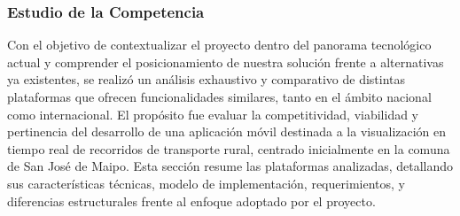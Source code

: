 \documentclass[12pt]{article}
\begin{document}
\subsubsection{Estudio de la Competencia}
Con el objetivo de contextualizar el proyecto dentro del panorama tecnológico actual y comprender el posicionamiento de nuestra solución frente a alternativas ya existentes, se realizó un análisis exhaustivo y comparativo de distintas plataformas que ofrecen funcionalidades similares, tanto en el ámbito nacional como internacional. El propósito fue evaluar la competitividad, viabilidad y pertinencia del desarrollo de una aplicación móvil destinada a la visualización en tiempo real de recorridos de transporte rural, centrado inicialmente en la comuna de San José de Maipo. Esta sección resume las plataformas analizadas, detallando sus características técnicas, modelo de implementación, requerimientos, y diferencias estructurales frente al enfoque adoptado por el proyecto.
\end{document}
